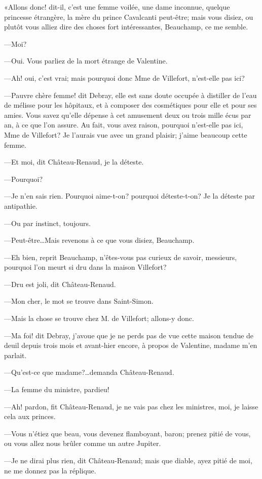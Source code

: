 «Allons donc! dit-il, c'est une femme voilée, une dame inconnue, quelque princesse étrangère, la mère du prince Cavalcanti peut-être; mais vous disiez, ou plutôt vous alliez dire des choses fort intéressantes, Beauchamp, ce me semble. 

—Moi? 

—Oui. Vous parliez de la mort étrange de Valentine. 

—Ah! oui, c'est vrai; mais pourquoi donc Mme de Villefort, n'est-elle pas ici? 

—Pauvre chère femme! dit Debray, elle est sans doute occupée à distiller de l'eau de mélisse pour les hôpitaux, et à composer des cosmétiques pour elle et pour ses amies. Vous savez qu'elle dépense à cet amusement deux ou trois mille écus par an, à ce que l'on assure. Au fait, vous avez raison, pourquoi n'est-elle pas ici, Mme de Villefort? Je l'aurais vue avec un grand plaisir; j'aime beaucoup cette femme. 

—Et moi, dit Château-Renaud, je la déteste. 

—Pourquoi? 

—Je n'en sais rien. Pourquoi aime-t-on? pourquoi déteste-t-on? Je la déteste par antipathie. 

—Ou par instinct, toujours. 

—Peut-être\dots Mais revenons à ce que vous disiez, Beauchamp. 

—Eh bien, reprit Beauchamp, n'êtes-vous pas curieux de savoir, messieurs, pourquoi l'on meurt si dru dans la maison Villefort? 

—Dru est joli, dit Château-Renaud. 

—Mon cher, le mot se trouve dans Saint-Simon. 

—Mais la chose se trouve chez M. de Villefort; allons-y donc. 

—Ma foi! dit Debray, j'avoue que je ne perds pas de vue cette maison tendue de deuil depuis trois mois et avant-hier encore, à propos de Valentine, madame m'en parlait. 

—Qu'est-ce que madame?\dots demanda Château-Renaud. 

—La femme du ministre, pardieu! 

—Ah! pardon, fit Château-Renaud, je ne vais pas chez les ministres, moi, je laisse cela aux princes. 

—Vous n'étiez que beau, vous devenez flamboyant, baron; prenez pitié de vous, ou vous allez nous brûler comme un autre Jupiter. 

—Je ne dirai plus rien, dit Château-Renaud; mais que diable, ayez pitié de moi, ne me donnez pas la réplique. 


